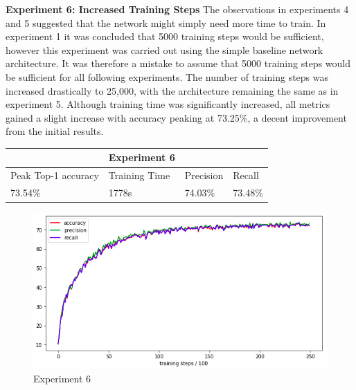 \documentclass[12pt]{report}
\begin{document}
\newpage
\begin{flushleft}
\vspace{0.5cm}
\textbf{Experiment 6: Increased Training Steps}
\linebreak
The observations in experiments 4 and 5 suggested that the network might simply need more time to train. In experiment 1 it was concluded that 5000 training steps would be sufficient, however this experiment was carried out using the simple baseline network architecture. It was therefore a mistake to assume that 5000 training steps would be sufficient for all following experiments. The number of training steps was increased drastically to 25,000, with the architecture remaining the same as in experiment 5. Although training time was significantly increased, all metrics gained a slight increase with accuracy peaking at 73.25\%, a decent improvement from the initial results.

\vspace{0.5cm}
\begin{tabular}{llll}
                                          & \multicolumn{1}{c}{Experiment 6}   &                                &                              \\ \hline
\multicolumn{1}{|l|}{Peak Top-1 accuracy} & \multicolumn{1}{l|}{Training Time} & \multicolumn{1}{l|}{Precision} & \multicolumn{1}{l|}{Recall}  \\ \hline
\multicolumn{1}{|l|}{73.54\%}             & \multicolumn{1}{l|}{1778s}         & \multicolumn{1}{l|}{74.03\%}   & \multicolumn{1}{l|}{73.48\%} \\ \hline
\end{tabular}

\vspace{0.5cm}
\begin{figure}[h]
	\centering
	\includegraphics[width=12cm]{experiment-6}
	\caption{Experiment 6}
	\label{fig:experiment-6}
\end{figure}

\end{flushleft}
\end{document}
